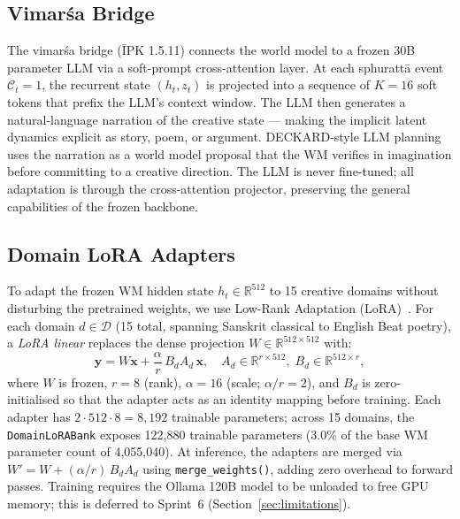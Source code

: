\documentclass[journal,onecolumn,11pt]{IEEEtran}
\begin{document}
\subsection{Vimarśa Bridge}

The vimarśa bridge (ĪPK 1.5.11) connects the world model to a frozen 30B
parameter LLM via a soft-prompt cross-attention layer.
At each sphurattā event $\mathcal{C}_t = 1$, the recurrent state
$(h_t, z_t)$ is projected into a sequence of $K = 16$ soft tokens that
prefix the LLM's context window.
The LLM then generates a natural-language narration of the creative state —
making the implicit latent dynamics explicit as story, poem, or argument.
DECKARD-style LLM planning~\cite{zhu2024deckard} uses the narration as
a world model proposal that the WM verifies in imagination before committing
to a creative direction.
The LLM is never fine-tuned; all adaptation is through the cross-attention
projector, preserving the general capabilities of the frozen backbone.

\subsection{Domain LoRA Adapters}\label{sec:lora}

To adapt the frozen WM hidden state $h_t \in \mathbb{R}^{512}$ to 15 creative
domains without disturbing the pretrained weights, we use Low-Rank Adaptation
(LoRA)~\cite{hu2022lora}.
For each domain $d \in \mathcal{D}$ (15 total, spanning Sanskrit classical to
English Beat poetry), a \emph{LoRA linear} replaces the dense projection
$W \in \mathbb{R}^{512 \times 512}$ with:
%
\begin{equation}
  \mathbf{y} = W\mathbf{x} + \frac{\alpha}{r}\,B_d A_d\,\mathbf{x},
  \quad A_d \in \mathbb{R}^{r \times 512},\; B_d \in \mathbb{R}^{512 \times r},
\end{equation}
%
where $W$ is frozen, $r = 8$ (rank), $\alpha = 16$ (scale; $\alpha/r = 2$),
and $B_d$ is zero-initialised so that the adapter acts as an identity mapping
before training.
Each adapter has $2 \cdot 512 \cdot 8 = 8{,}192$ trainable parameters;
across 15 domains, the \texttt{DomainLoRABank} exposes 122{,}880 trainable
parameters (3.0\% of the base WM parameter count of 4{,}055{,}040).
At inference, the adapters are merged via
$W' = W + (\alpha/r)\,B_d A_d$ using \texttt{merge\_weights()}, adding
zero overhead to forward passes.
Training requires the Ollama 120B model to be unloaded to free GPU memory;
this is deferred to Sprint~6 (Section~\ref{sec:limitations}).
\end{document}
